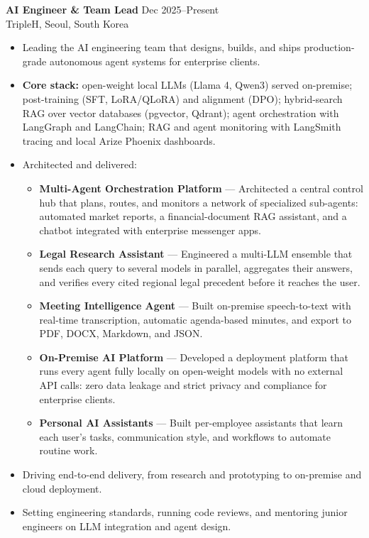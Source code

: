 \documentclass[11pt,a4paper]{article}
\begin{document}
\textbf{AI Engineer \& Team Lead} \hfill Dec 2025--Present \\
TripleH, Seoul, South Korea
\begin{itemize}
    \item Leading the AI engineering team that designs, builds, and ships production-grade autonomous agent
systems for enterprise clients.
    \item \textbf{Core stack:} open-weight local LLMs (Llama 4, Qwen3) served on-premise; post-training (SFT,
LoRA/QLoRA) and alignment (DPO); hybrid-search RAG over vector databases (pgvector, Qdrant); agent orchestration
with LangGraph and LangChain; RAG and agent monitoring with LangSmith tracing and local Arize Phoenix dashboards.
    \item Architected and delivered:
    \begin{itemize}
        \item \textbf{Multi-Agent Orchestration Platform} --- Architected a central control hub that plans, routes,
and monitors a network of specialized sub-agents: automated market reports, a financial-document RAG
assistant, and a chatbot integrated with enterprise messenger apps.
        \item \textbf{Legal Research Assistant} --- Engineered a multi-LLM ensemble that sends each query to several
models in parallel, aggregates their answers, and verifies every cited regional legal precedent before it
reaches the user.
        \item \textbf{Meeting Intelligence Agent} --- Built on-premise speech-to-text with real-time transcription,
automatic agenda-based minutes, and export to PDF, DOCX, Markdown, and JSON.
        \item \textbf{On-Premise AI Platform} --- Developed a deployment platform that runs every agent fully
locally on open-weight models with no external API calls: zero data leakage and strict privacy and
compliance for enterprise clients.
        \item \textbf{Personal AI Assistants} --- Built per-employee assistants that learn each user's tasks,
communication style, and workflows to automate routine work.
    \end{itemize}
    \item Driving end-to-end delivery, from research and prototyping to on-premise and cloud deployment.
    \item Setting engineering standards, running code reviews, and mentoring junior engineers on LLM
integration and agent design.
\end{itemize}
\end{document}
